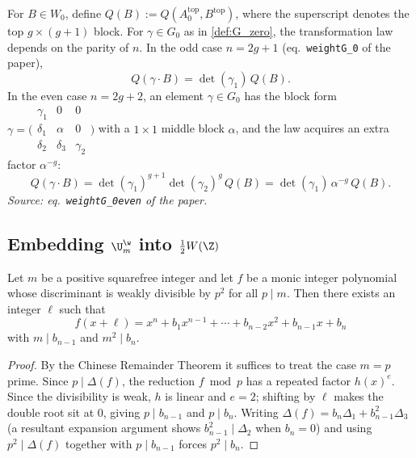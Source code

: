 \begin{definition}[\(Q\)-invariant on \(W_0\)]
  \label{def:Q_invariant_W}
  For \(B\in W_0\), define
  \(Q(B):=Q(A_0^{\mathrm{top}},B^{\mathrm{top}})\), where the
  superscript denotes the top \(g\times(g+1)\) block.  For
  \(\gamma\in G_0\) as in \cref{def:G_zero}, the transformation law
  depends on the parity of \(n\).  In the odd case \(n=2g+1\) (eq.\ \texttt{weightG\_0} of the paper),
  \[
    Q(\gamma\cdot B)=\det(\gamma_1)\,Q(B).
  \]
  In the even case \(n=2g+2\), an element \(\gamma\in G_0\) has the
  block form
  \(\gamma=\bigl(\begin{smallmatrix}\gamma_1 & 0 & 0\\ \delta_1 &
  \alpha & 0\\ \delta_2 & \delta_3 & \gamma_2\end{smallmatrix}\bigr)\)
  with a \(1\times 1\) middle block \(\alpha\), and the law acquires an
  extra factor \(\alpha^{-g}\):
  \[
    Q(\gamma\cdot B)
    =\det(\gamma_1)^{g+1}\det(\gamma_2)^{g}\,Q(B)
    =\det(\gamma_1)\,\alpha^{-g}\,Q(B).
  \]
  \textit{Source: eq.\ \texttt{weightG\_0even} of the paper.}
\end{definition}

\subsection{Embedding $\U_m^\w$ into $\frac12W(\Z)$}


\begin{lemma}
  \label{lem:hiddenp2}
  Let \(m\) be a positive squarefree integer and let \(f\) be a monic
  integer polynomial whose discriminant is weakly divisible by \(p^2\)
  for all \(p\mid m\).  Then there exists an integer \(\ell\) such
  that
  \[
    f(x+\ell)=x^n+b_1x^{n-1}+\cdots+b_{n-2}x^2+b_{n-1}x+b_n
  \]
  with \(m\mid b_{n-1}\) and \(m^2\mid b_n\).
\end{lemma}
\begin{proof}
  By the Chinese Remainder Theorem it suffices to treat the case
  \(m=p\) prime.  Since \(p\mid\Delta(f)\), the reduction \(f\bmod p\)
  has a repeated factor \(h(x)^e\).  Since the divisibility is weak,
  \(h\) is linear and \(e=2\); shifting by \(\ell\) makes the double
  root sit at \(0\), giving \(p\mid b_{n-1}\) and \(p\mid b_n\).
  Writing \(\Delta(f)=b_n\Delta_1+b_{n-1}^2\Delta_3\) (a resultant
  expansion argument shows \(b_{n-1}^2\mid\Delta_2\) when \(b_n=0\))
  and using \(p^2\mid\Delta(f)\) together with \(p\mid b_{n-1}\)
  forces \(p^2\mid b_n\).
\end{proof}

